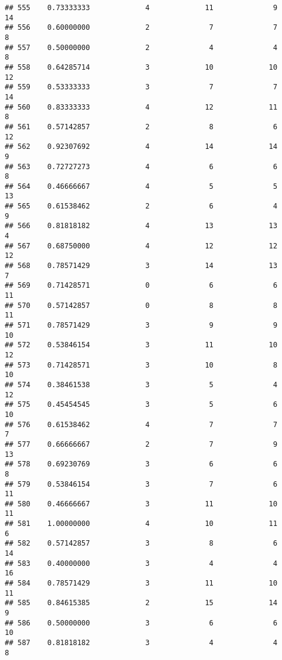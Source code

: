 \documentclass[
]{article}
\begin{document}
\begin{verbatim}
## 555    0.73333333             4             11              9             14
## 556    0.60000000             2              7              7              8
## 557    0.50000000             2              4              4              8
## 558    0.64285714             3             10             10             12
## 559    0.53333333             3              7              7             14
## 560    0.83333333             4             12             11              8
## 561    0.57142857             2              8              6             12
## 562    0.92307692             4             14             14              9
## 563    0.72727273             4              6              6              8
## 564    0.46666667             4              5              5             13
## 565    0.61538462             2              6              4              9
## 566    0.81818182             4             13             13              4
## 567    0.68750000             4             12             12             12
## 568    0.78571429             3             14             13              7
## 569    0.71428571             0              6              6             11
## 570    0.57142857             0              8              8             11
## 571    0.78571429             3              9              9             10
## 572    0.53846154             3             11             10             12
## 573    0.71428571             3             10              8             10
## 574    0.38461538             3              5              4             12
## 575    0.45454545             3              5              6             10
## 576    0.61538462             4              7              7              7
## 577    0.66666667             2              7              9             13
## 578    0.69230769             3              6              6              8
## 579    0.53846154             3              7              6             11
## 580    0.46666667             3             11             10             11
## 581    1.00000000             4             10             11              6
## 582    0.57142857             3              8              6             14
## 583    0.40000000             3              4              4             16
## 584    0.78571429             3             11             10             11
## 585    0.84615385             2             15             14              9
## 586    0.50000000             3              6              6             10
## 587    0.81818182             3              4              4              8

\end{verbatim}
\end{document}
